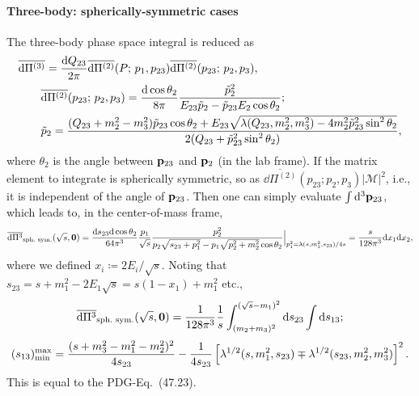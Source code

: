 \documentclass[CheatSheet]{subfiles}
\begin{document}
\paragraph{Three-body: spherically-symmetric cases}
The three-body phase space integral is reduced as
\begin{align}
  &\overline{\dd\Pi^{(3)}}
  =\frac{\dd Q_{23}}{2\pi}
  \overline{\dd\Pi^{(2)}}(P;\,p_1,p_{23})
  \overline{\dd\Pi^{(2)}}(p_{23};\,p_2,p_3),
\\&
\qquad\overline{\dd\Pi^{(2)}}(p_{23};\,p_2,p_3)=
\frac{\dd\cos\theta_{2}}{8\pi}
\frac{\tilde p_{2}^2}{E_{23}\tilde p_2 - \tilde p_{23}E_2\cos\theta_2};
\\
&
\qquad\tilde p_2=\frac{(Q_{23}+m_2^2-m_3^2)\tilde p_{23}\cos\theta_2
 + E_{23}\sqrt{\Kallen(Q_{23},m_2^2,m_3^2)-4m_2^2\tilde p_{23}^2 \sin^2\theta_2}
}{2(Q_{23}+\tilde p_{23}^2\sin^2\theta_2)},
\end{align}
where $\theta_2$ is the angle between ${\mathbf{p}}_{23}$ and ${\mathbf{p}}_2$ (in the lab frame).
If the matrix element to integrate is spherically symmetric, so as $\overline{\dd\Pi^{(2)}}(p_{23};p_2,p_3)|\mathcal M|^2$, i.e., it is independent of the angle of ${\mathbf{p}}_{23}$. Then one can simply evaluate  $\int{\mathrm{d}}^3{\mathbf{p}}_{23}$, which leads to, in the center-of-mass frame,
\begin{equation}
\overline{{\mathrm{d}}\Pi^3}_{\text{sph.\ sym.}}(\sqrt{s}, {\mathbf{0}})
=
\frac{{\mathrm{d}} s_{23}{\mathrm{d}}\cos\theta_{2}}{64\pi^3}
\frac{p_1}{\sqrt s}
\frac{p_{2}^2}{p_2\sqrt{s_{23}+p_1^2} - p_1\sqrt{p_2^2+m_2^2}\cos\theta_2}\Big|_{
 p_1^2=\lambda(s,m_1^2,s_{23})/4s
}
= \frac{s}{128\pi^3}{\mathrm{d}} x_1{\mathrm{d}} x_2,
\end{equation}
where we defined $x_i\coloneq {2E_i}/{\sqrt s}$. Noting that $s_{23}=s+m_1^2-2E_1\sqrt{s}=s(1-x_1)+m_1^2$ etc., 
\begin{equation}
 \overline{\dd\Pi^3}_{\text{sph.\ sym.}}(\sqrt{s}, \vc 0)
=
\frac{1}{128\pi^3}\frac{1}{s}
\int_{(m_2+m_3)^2}^{(\sqrt{s}-m_1)^2}\dd s_{23}\int\dd s_{13};
\end{equation}
\begin{equation}
 (s_{13})^{\text{max}}_{\text{min}} =
\frac{(s+m_3^2-m_1^2-m_2^2)^2}{4s_{23}}
-\frac{1}{4s_{23}}
\left[\Kallen[1/2](s,m_1^2,s_{23})\mp\Kallen[1/2](s_{23},m_2^2,m_3^2)\right]^2.
\end{equation}
This is equal to the PDG-Eq.~(47.23)\cite{PDG2018}.
\end{document}
